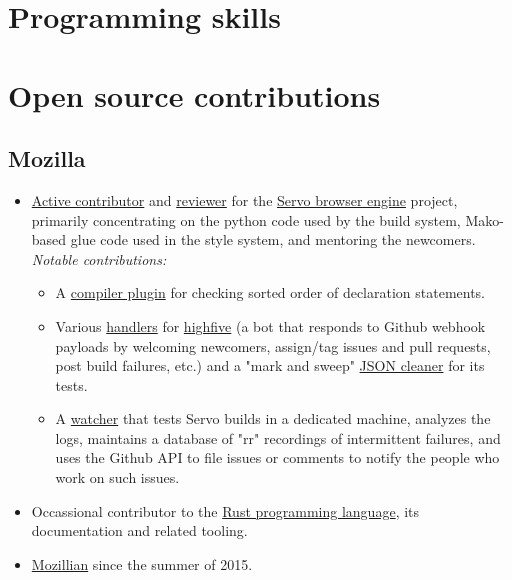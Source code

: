 \documentclass[11pt,a4paper,sans]{moderncv}        %
\newcommand\chref[3][linky]{\href{#2}{\color{#1}#3}}
\begin{document}
\section{Programming skills}

\newpage

\section{Open source contributions}
\subsection{Mozilla}
\begin{itemize}
\item \chref{https://github.com/servo/servo/commits?author=Wafflespeanut}{Active contributor} and \chref{https://blog.servo.org/2016/01/11/twis-47/}{reviewer} for the \chref{https://github.com/servo/servo}{Servo browser engine} project, primarily concentrating on the python code used by the build system, Mako-based glue code used in the style system, and mentoring the newcomers.
\newline
\textit{Notable contributions:}
\begin{itemize}
\item A \chref{https://github.com/Wafflespeanut/rust-sorty}{compiler plugin} for checking sorted order of declaration statements.
\item Various \chref{https://github.com/servo/highfive/commits?author=Wafflespeanut}{handlers} for \chref{https://github.com/servo/highfive}{highfive} (a bot that responds to Github webhook payloads by welcoming newcomers, assign/tag issues and pull requests, post build failures, etc.) and a "mark and sweep" \chref{https://github.com/servo/highfive/pull/115}{JSON cleaner} for its tests.
\item A \chref{https://github.com/servo-automation/servo-wpt}{watcher} that tests Servo builds in a dedicated machine, analyzes the logs, maintains a database of "rr" recordings of intermittent failures, and uses the Github API to file issues or comments to notify the people who work on such issues.
\end{itemize}
\item Occassional contributor to the \chref{https://github.com/rust-lang/rust}{Rust programming language}, its documentation and related tooling.
\item \chref{https://mozillians.org/en-US/u/wafflespeanut}{Mozillian} since the summer of 2015.
\end{itemize}
\end{document}
